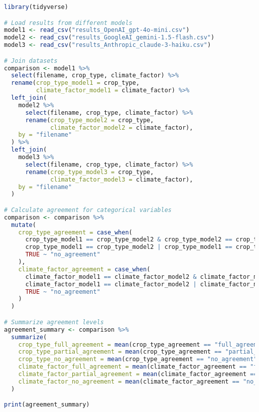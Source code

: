 \begin{commandbox}
\begin{lstlisting}[language=R]
library(tidyverse)

# Load results from different models
model1 <- read_csv("results_OpenAI_gpt-4o-mini.csv")
model2 <- read_csv("results_GoogleAI_gemini-1.5-flash.csv")
model3 <- read_csv("results_Anthropic_claude-3-haiku.csv")

# Join datasets
comparison <- model1 %>%
  select(filename, crop_type, climate_factor) %>%
  rename(crop_type_model1 = crop_type,
         climate_factor_model1 = climate_factor) %>%
  left_join(
    model2 %>%
      select(filename, crop_type, climate_factor) %>%
      rename(crop_type_model2 = crop_type,
             climate_factor_model2 = climate_factor),
    by = "filename"
  ) %>%
  left_join(
    model3 %>%
      select(filename, crop_type, climate_factor) %>%
      rename(crop_type_model3 = crop_type,
             climate_factor_model3 = climate_factor),
    by = "filename"
  )

# Calculate agreement for categorical variables
comparison <- comparison %>%
  mutate(
    crop_type_agreement = case_when(
      crop_type_model1 == crop_type_model2 & crop_type_model2 == crop_type_model3 ~ "full_agreement",
      crop_type_model1 == crop_type_model2 | crop_type_model1 == crop_type_model3 | crop_type_model2 == crop_type_model3 ~ "partial_agreement",
      TRUE ~ "no_agreement"
    ),
    climate_factor_agreement = case_when(
      climate_factor_model1 == climate_factor_model2 & climate_factor_model2 == climate_factor_model3 ~ "full_agreement",
      climate_factor_model1 == climate_factor_model2 | climate_factor_model1 == climate_factor_model3 | climate_factor_model2 == climate_factor_model3 ~ "partial_agreement",
      TRUE ~ "no_agreement"
    )
  )

# Summarize agreement levels
agreement_summary <- comparison %>%
  summarize(
    crop_type_full_agreement = mean(crop_type_agreement == "full_agreement"),
    crop_type_partial_agreement = mean(crop_type_agreement == "partial_agreement"),
    crop_type_no_agreement = mean(crop_type_agreement == "no_agreement"),
    climate_factor_full_agreement = mean(climate_factor_agreement == "full_agreement"),
    climate_factor_partial_agreement = mean(climate_factor_agreement == "partial_agreement"),
    climate_factor_no_agreement = mean(climate_factor_agreement == "no_agreement")
  )

print(agreement_summary)
\end{lstlisting}
\end{commandbox}

